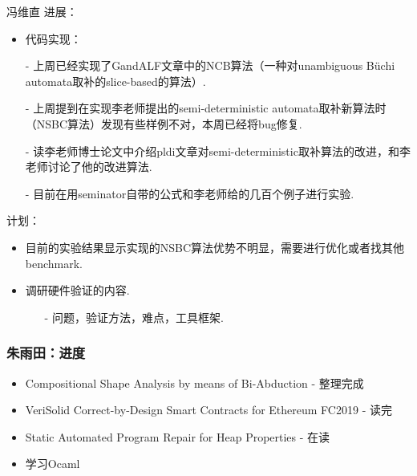 \documentclass[aspectratio=1610, 13pt]{beamer}
\newcommand{\buchi}{B\"uchi }
\begin{document}
\begin{frame}{冯维直}
进展：
    \begin{itemize}
        \item 代码实现：
        \item [-] 上周已经实现了GandALF文章中的NCB算法（一种对unambiguous \buchi automata取补的slice-based的算法）.
        \item [-] 上周提到在实现李老师提出的semi-deterministic automata取补新算法时（NSBC算法）发现有些样例不对，本周已经将bug修复.
        \item [-] 读李老师博士论文中介绍pldi文章对semi-deterministic取补算法的改进，和李老师讨论了他的改进算法.
        \item [-] 目前在用seminator自带的公式和李老师给的几百个例子进行实验.
        
\end{itemize}    
计划：
    \begin{itemize}
        \item 目前的实验结果显示实现的NSBC算法优势不明显，需要进行优化或者找其他benchmark.
        \item 调研硬件验证的内容.
        \begin{itemize}
            \item [-] 问题，验证方法，难点，工具框架.
        \end{itemize}
\end{itemize}    
\end{frame}

\begin{frame}\frametitle{朱雨田：进度}
\begin{itemize}

\item Compositional Shape Analysis by means of Bi-Abduction - 整理完成
\item VeriSolid Correct-by-Design Smart Contracts for Ethereum FC2019 - 读完
\item Static Automated Program Repair for Heap Properties - 在读
\item 学习Ocaml
\end{itemize}
\end{frame}
\end{document}
